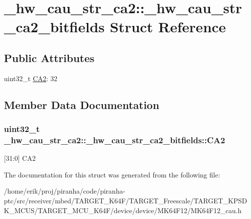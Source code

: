 \hypertarget{struct__hw__cau__str__ca2_1_1__hw__cau__str__ca2__bitfields}{}\section{\+\_\+hw\+\_\+cau\+\_\+str\+\_\+ca2\+:\+:\+\_\+hw\+\_\+cau\+\_\+str\+\_\+ca2\+\_\+bitfields Struct Reference}
\label{struct__hw__cau__str__ca2_1_1__hw__cau__str__ca2__bitfields}
\subsection*{Public Attributes}
\begin{DoxyCompactItemize}
\item 
uint32\+\_\+t \hyperlink{struct__hw__cau__str__ca2_1_1__hw__cau__str__ca2__bitfields_ab331cc9c396ad52a0fc7fd62f6d252e0}{C\+A2}\+: 32
\end{DoxyCompactItemize}


\subsection{Member Data Documentation}
\subsubsection[{\texorpdfstring{C\+A2}{CA2}}]{\setlength{\rightskip}{0pt plus 5cm}uint32\+\_\+t \+\_\+hw\+\_\+cau\+\_\+str\+\_\+ca2\+::\+\_\+hw\+\_\+cau\+\_\+str\+\_\+ca2\+\_\+bitfields\+::\+C\+A2}\hypertarget{struct__hw__cau__str__ca2_1_1__hw__cau__str__ca2__bitfields_ab331cc9c396ad52a0fc7fd62f6d252e0}{}\label{struct__hw__cau__str__ca2_1_1__hw__cau__str__ca2__bitfields_ab331cc9c396ad52a0fc7fd62f6d252e0}
\mbox{[}31\+:0\mbox{]} C\+A2 

The documentation for this struct was generated from the following file\+:\begin{DoxyCompactItemize}
\item 
/home/erik/proj/piranha/code/piranha-\/ptc/src/receiver/mbed/\+T\+A\+R\+G\+E\+T\+\_\+\+K64\+F/\+T\+A\+R\+G\+E\+T\+\_\+\+Freescale/\+T\+A\+R\+G\+E\+T\+\_\+\+K\+P\+S\+D\+K\+\_\+\+M\+C\+U\+S/\+T\+A\+R\+G\+E\+T\+\_\+\+M\+C\+U\+\_\+\+K64\+F/device/device/\+M\+K64\+F12/M\+K64\+F12\+\_\+cau.\+h\end{DoxyCompactItemize}
